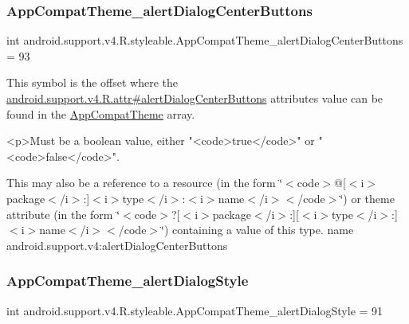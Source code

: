 \subsubsection{\texorpdfstring{App\+Compat\+Theme\+\_\+alert\+Dialog\+Center\+Buttons}{AppCompatTheme\_alertDialogCenterButtons}}
{\footnotesize\ttfamily int android.\+support.\+v4.\+R.\+styleable.\+App\+Compat\+Theme\+\_\+alert\+Dialog\+Center\+Buttons = 93\hspace{0.3cm}{\ttfamily [static]}}

This symbol is the offset where the \hyperlink{classandroid_1_1support_1_1v4_1_1R_1_1attr_ab442f1d86be2bfb0af44b257ac0b224a}{android.\+support.\+v4.\+R.\+attr\#alert\+Dialog\+Center\+Buttons} attribute\textquotesingle{}s value can be found in the \hyperlink{classandroid_1_1support_1_1v4_1_1R_1_1styleable_ac07ebbe62ed977f6dcaadc6397840ace}{App\+Compat\+Theme} array.

\begin{DoxyVerb}      <p>Must be a boolean value, either "<code>true</code>" or "<code>false</code>".
\end{DoxyVerb}
 

This may also be a reference to a resource (in the form \char`\"{}$<$code$>$@\mbox{[}$<$i$>$package$<$/i$>$\+:\mbox{]}$<$i$>$type$<$/i$>$\+:$<$i$>$name$<$/i$>$$<$/code$>$\char`\"{}) or theme attribute (in the form \char`\"{}$<$code$>$?\mbox{[}$<$i$>$package$<$/i$>$\+:\mbox{]}\mbox{[}$<$i$>$type$<$/i$>$\+:\mbox{]}$<$i$>$name$<$/i$>$$<$/code$>$\char`\"{}) containing a value of this type.  name android.\+support.\+v4\+:alert\+Dialog\+Center\+Buttons \mbox{\label{classandroid_1_1support_1_1v4_1_1R_1_1styleable_a7ef5fa1da3e7689dcf99a6e3e7d47d88}} 
\subsubsection{\texorpdfstring{App\+Compat\+Theme\+\_\+alert\+Dialog\+Style}{AppCompatTheme\_alertDialogStyle}}
{\footnotesize\ttfamily int android.\+support.\+v4.\+R.\+styleable.\+App\+Compat\+Theme\+\_\+alert\+Dialog\+Style = 91\hspace{0.3cm}{\ttfamily [static]}}

